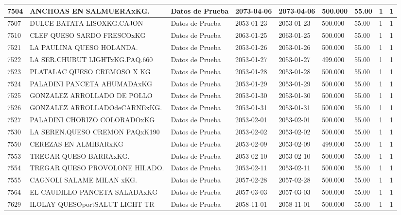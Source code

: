 \documentclass[a4paper,12pt]{article}
\begin{document}
\begin{landscape}
\begin{longtable}{|p{4cm}|p{2.5cm}|p{2.5cm}|p{1.8cm}|p{1.8cm}|p{1cm}|p{1cm}|p{3cm}|p{3cm}||}
7504 & ANCHOAS EN SALMUERAxKG. & Datos de Prueba & 2073-04-06 & 2073-04-06 & 500.000 & 55.00 & 1 & 1 \\ \hline 
7507 & DULCE BATATA LISOXKG.CAJON & Datos de Prueba & 2053-01-23 & 2053-01-23 & 500.000 & 55.00 & 1 & 1 \\ \hline 
7510 & CLEF QUESO SARDO FRESCOxKG & Datos de Prueba & 2063-01-25 & 2063-01-25 & 500.000 & 55.00 & 1 & 1 \\ \hline 
7521 & LA PAULINA QUESO HOLANDA. & Datos de Prueba & 2053-01-26 & 2053-01-26 & 500.000 & 55.00 & 1 & 1 \\ \hline 
7522 & LA SER.CHUBUT LIGHTxKG.PAQ.660 & Datos de Prueba & 2053-01-27 & 2053-01-27 & 499.000 & 55.00 & 1 & 1 \\ \hline 
7523 & PLATALAC QUESO CREMOSO X KG & Datos de Prueba & 2053-01-28 & 2053-01-28 & 500.000 & 55.00 & 1 & 1 \\ \hline 
7524 & PALADINI PANCETA AHUMADAxKG & Datos de Prueba & 2053-01-29 & 2053-01-29 & 500.000 & 55.00 & 1 & 1 \\ \hline 
7525 & GONZALEZ ARROLLADO DE POLLO & Datos de Prueba & 2053-01-30 & 2053-01-30 & 500.000 & 55.00 & 1 & 1 \\ \hline 
7526 & GONZALEZ ARROLLADOdeCARNExKG. & Datos de Prueba & 2053-01-31 & 2053-01-31 & 500.000 & 55.00 & 1 & 1 \\ \hline 
7527 & PALADINI CHORIZO COLORADOxKG & Datos de Prueba & 2053-02-01 & 2053-02-01 & 500.000 & 55.00 & 1 & 1 \\ \hline 
7530 & LA SEREN.QUESO CREMON PAQxK190 & Datos de Prueba & 2053-02-02 & 2053-02-02 & 500.000 & 55.00 & 1 & 1 \\ \hline 
7550 & CEREZAS EN ALMIBARxKG & Datos de Prueba & 2053-02-09 & 2053-02-09 & 499.000 & 55.00 & 1 & 1 \\ \hline 
7553 & TREGAR QUESO BARRAxKG. & Datos de Prueba & 2053-02-10 & 2053-02-10 & 500.000 & 55.00 & 1 & 1 \\ \hline 
7554 & TREGAR QUESO PROVOLONE HILADO. & Datos de Prueba & 2053-02-11 & 2053-02-11 & 500.000 & 55.00 & 1 & 1 \\ \hline 
7555 & CAGNOLI SALAME MILAN xKG. & Datos de Prueba & 2057-02-28 & 2057-02-28 & 500.000 & 55.00 & 1 & 1 \\ \hline 
7564 & EL CAUDILLO PANCETA SALADAxKG & Datos de Prueba & 2057-03-03 & 2057-03-03 & 500.000 & 55.00 & 1 & 1 \\ \hline 
7629 & ILOLAY QUESOportSALUT LIGHT TR & Datos de Prueba & 2058-11-01 & 2058-11-01 & 500.000 & 55.00 & 1 & 1 \\ \hline 

\end{longtable}
\end{landscape}
\end{document}
